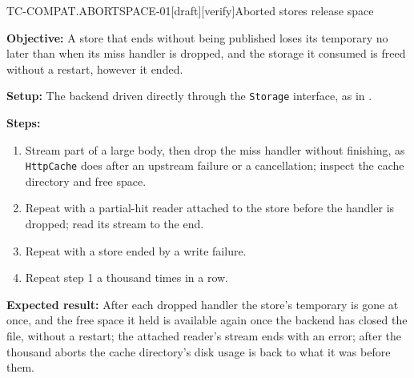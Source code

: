 \begin{requirement}{TC-COMPAT.ABORTSPACE-01}[draft][verify]{Aborted stores release space}


  \textbf{Objective:} A store that ends without being published loses its
  temporary no later than when its miss handler is dropped, and the storage
  it consumed is freed without a restart, however it ended.

  \textbf{Setup:} The backend driven directly through the \texttt{Storage}
  interface, as in .

  \textbf{Steps:}
  \begin{enumerate}
    \item Stream part of a large body, then drop the miss handler without
      finishing, as \texttt{HttpCache} does after an upstream failure or a
      cancellation; inspect the cache directory and free space.
    \item Repeat with a partial-hit reader attached to the store before the
      handler is dropped; read its stream to the end.
    \item Repeat with a store ended by a write failure.
    \item Repeat step 1 a thousand times in a row.
  \end{enumerate}

  \textbf{Expected result:} After each dropped handler the store's temporary is
  gone at once, and the free space it held is available again once the
  backend has closed the file, without a restart; the attached reader's
  stream ends with an error; after the thousand aborts the cache directory's
  disk usage is back to what it was before them.



\end{requirement}

